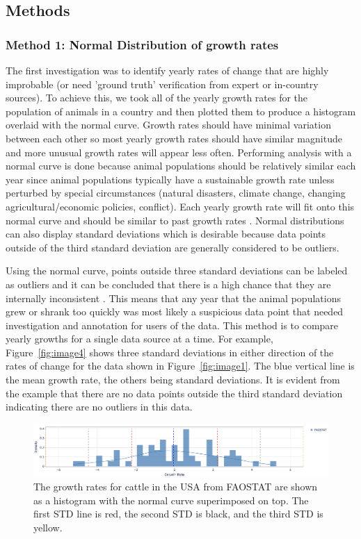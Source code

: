 \documentclass{article}
\begin{document}
\subsection{Methods}
\subsubsection{Method 1: Normal Distribution of growth rates}
The first investigation was to identify yearly rates of change that are highly improbable (or need 'ground truth' verification from expert or in-country sources). To achieve this, we took all of the yearly growth rates for the population of animals in a country and then plotted them to produce a histogram overlaid with the normal curve.
Growth rates should have minimal variation between each other so most yearly growth rates should have similar magnitude and more unusual growth rates will appear less often. Performing analysis with a normal curve is done because animal populations should be relatively similar each year since animal populations typically have a sustainable growth rate unless perturbed by special circumstances (natural disasters, climate change, changing agricultural/economic policies, conflict). Each yearly growth rate will fit onto this normal curve and should be similar to past growth rates \citep{Pardoe_Simon_Young}. Normal distributions can also display standard deviations which is desirable because data points outside of the third standard deviation are generally considered to be outliers.

Using the normal curve, points outside three standard deviations can be labeled as outliers and it can be concluded that there is a high chance that they are internally inconsistent \citep{oracle_outlier_nodate}. This means that any year that the animal populations grew or shrank too quickly was most likely a suspicious data point that needed investigation and annotation for users of the data. This method is to compare yearly growths for a single data source at a time. For example, Figure~\ref{fig:image4} shows three standard deviations in either direction of the rates of change for the data shown in Figure~\ref{fig:image1}. The blue vertical line is the mean growth rate, the others being standard deviations. It is evident from the example that there are no data points outside the third  standard deviation indicating there are no outliers in this data. 

\begin{figure}[h!]
    \centering
    \includegraphics[width=1\textwidth]{image3}
    \caption{The growth rates for cattle in the USA from FAOSTAT are shown as a histogram with the normal curve superimposed on top. The first STD line is red, the second STD is black, and the third STD is yellow.}
    \label{fig:image3}
\end{figure}
\end{document}
